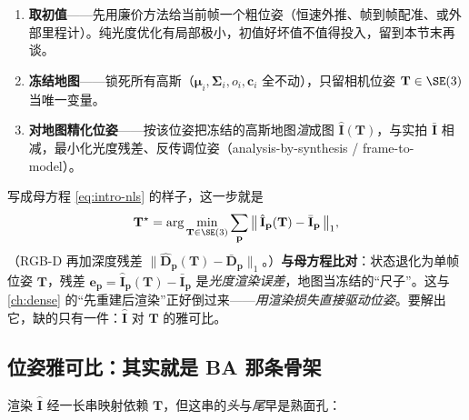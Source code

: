 \begin{enumerate}
  \item \textbf{取初值}——先用廉价方法给当前帧一个粗位姿（恒速外推、帧到帧配准、或外部里程计）。纯光度优化有局部极小，初值好坏值不值得投入，留到本节末再谈。
  \item \textbf{冻结地图}——锁死所有高斯（$\boldsymbol\mu_i,\boldsymbol\Sigma_i,o_i,\mathbf c_i$ 全不动），只留相机位姿 $\mathbf T\in\SE(3)$ 当唯一变量。
  \item \textbf{对地图精化位姿}——按该位姿把冻结的高斯地图\emph{渲}成图 $\hat{\mathbf I}(\mathbf T)$，与实拍 $\bar{\mathbf I}$ 相减，最小化光度残差、反传调位姿（analysis-by-synthesis / frame-to-model）。
\end{enumerate}

写成母方程 \cref{eq:intro-nls} 的样子，这一步就是
\begin{equation}
\mathbf T^\star=\arg\min_{\mathbf T\in\SE(3)}\sum_{\mathbf p}\big\lVert\,\hat{\mathbf I}_{\mathbf p}(\mathbf T)-\bar{\mathbf I}_{\mathbf p}\,\big\rVert_1 ,
\label{eq:gs-track}
\end{equation}
（RGB-D 再加深度残差 $\lVert\hat{\mathbf D}_{\mathbf p}(\mathbf T)-\bar{\mathbf D}_{\mathbf p}\rVert_1$。）\textbf{与母方程比对}：状态退化为单帧位姿 $\mathbf T$，残差 $\mathbf e_{\mathbf p}=\hat{\mathbf I}_{\mathbf p}(\mathbf T)-\bar{\mathbf I}_{\mathbf p}$ 是\emph{光度渲染误差}，地图当冻结的“尺子”。这与 \cref{ch:dense} 的“先重建后渲染”正好倒过来——\emph{用渲染损失直接驱动位姿}。要解出它，缺的只有一件：$\hat{\mathbf I}$ 对 $\mathbf T$ 的雅可比。

\subsection{位姿雅可比：其实就是 BA 那条骨架}

渲染 $\hat{\mathbf I}$ 经一长串映射依赖 $\mathbf T$，但这串的\emph{头}与\emph{尾}早是熟面孔：


